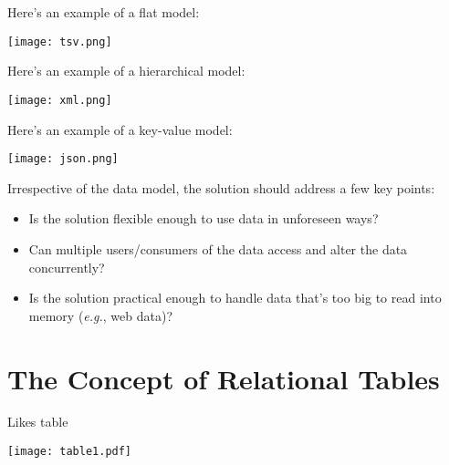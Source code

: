 \documentclass[mathserif, xcolor=table, pdfpages, default, graphics, listings]{beamer}
\begin{document}
        \begin{frame}
        Here's an example of a flat model:
        \centerline{
        \texttt{[image: tsv.png]}
        }
        \end{frame}


        \begin{frame}
        Here's an example of a hierarchical model:
        \centerline{
        \texttt{[image: xml.png]}
        }
        \end{frame}


        \begin{frame}
        Here's an example of a key-value model:
        \centerline{
        \texttt{[image: json.png]}
        }
        \end{frame}

        \begin{frame}
        Irrespective of the data model, the solution should address a few key points:
            \begin{itemize}
                \pause\item Is the solution flexible enough to use data in unforeseen ways?
                \pause\item Can multiple users/consumers of the data access and alter the data concurrently?
                \pause\item Is the solution practical enough to handle data that's too big to read into memory (\emph{e.g.}, web data)?
            \end{itemize}
        \end{frame}


    \section{The Concept of Relational Tables}




        \begin{frame}
        {Likes table}
        \centerline{
        \texttt{[image: table1.pdf]}
        }
        \end{frame}
\end{document}
